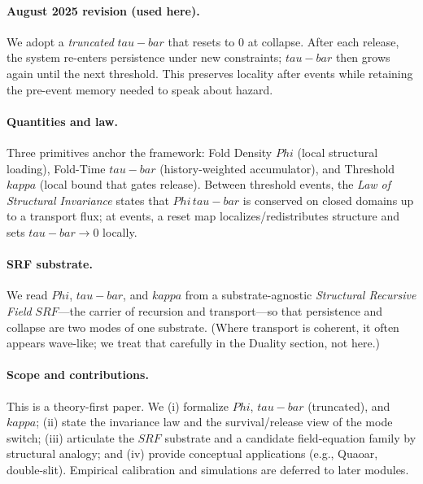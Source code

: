 \documentclass[12pt]{article}
\newcommand{\FoldDensity}{\Phi}
\newcommand{\FoldTime}{\bar{\tau}}
\newcommand{\Threshold}{\kappa}
\newcommand{\Survival}{S}
\newcommand{\Release}{R}
\newcommand{\SRF}{\mathcal{F}_{\mathrm{SR}}}
\def\FoldDensity{Phi}%
\def\FoldTime{tau-bar}%
\def\Threshold{kappa}%
\def\SRF{SRF}%
\def\Survival{S}%
\def\Release{R}%
\def\bar#1{#1}%
\def\mathcal#1{#1}%
\def\mathrm#1{#1}%
\begin{document}
\paragraph{August 2025 revision (used here).}
We adopt a \emph{truncated} $\FoldTime$ that resets to $0$ at collapse. After each release, the system re-enters persistence under new constraints; $\FoldTime$ then grows again until the next threshold. This preserves locality after events while retaining the pre-event memory needed to speak about hazard.

\paragraph{Quantities and law.}
Three primitives anchor the framework: Fold Density $\FoldDensity$ (local structural loading), Fold-Time $\FoldTime$ (history-weighted accumulator), and Threshold $\Threshold$ (local bound that gates release). Between threshold events, the \emph{Law of Structural Invariance} states that $\FoldDensity\,\FoldTime$ is conserved on closed domains up to a transport flux; at events, a reset map localizes/redistributes structure and sets $\FoldTime \to 0$ locally.

\paragraph{SRF substrate.}
We read $\FoldDensity$, $\FoldTime$, and $\Threshold$ from a substrate-agnostic \emph{Structural Recursive Field} $\SRF$—the carrier of recursion and transport—so that persistence and collapse are two modes of one substrate. (Where transport is coherent, it often appears wave-like; we treat that carefully in the Duality section, not here.)

\paragraph{Scope and contributions.}
This is a theory-first paper. We (i) formalize $\FoldDensity$, $\FoldTime$ (truncated), and $\Threshold$; (ii) state the invariance law and the survival/release view of the mode switch; (iii) articulate the $\SRF$ substrate and a candidate field-equation family by structural analogy; and (iv) provide conceptual applications (e.g., Quaoar, double-slit). Empirical calibration and simulations are deferred to later modules.


\makeatletter
{}
\makeatother
\providecommand{\FoldDensity}{\Phi}
\providecommand{\FoldTime}{\bar{\tau}}
\providecommand{\Threshold}{\kappa}
\providecommand{\Survival}{S}
\providecommand{\Release}{R}
\providecommand{\SRF}{\mathcal{F}_{\mathrm{SR}}}
\end{document}
